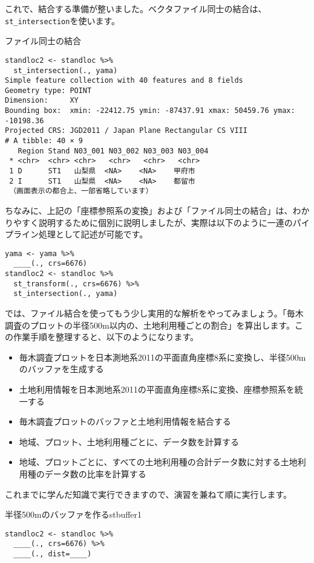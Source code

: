 これで、結合する準備が整いました。ベクタファイル同士の結合は、\verb|st_intersection|を使います。
\begin{itembox}[l]{ファイル同士の結合}
\begin{verbatim}
standloc2 <- standloc %>%
  st_intersection(., yama)
Simple feature collection with 40 features and 8 fields
Geometry type: POINT
Dimension:     XY
Bounding box:  xmin: -22412.75 ymin: -87437.91 xmax: 50459.76 ymax: -10198.36
Projected CRS: JGD2011 / Japan Plane Rectangular CS VIII
# A tibble: 40 × 9
   Region Stand N03_001 N03_002 N03_003 N03_004
 * <chr>  <chr> <chr>   <chr>   <chr>   <chr>
 1 D      ST1   山梨県  <NA>    <NA>    甲府市
 2 I      ST1   山梨県  <NA>    <NA>    都留市
 （画面表示の都合上、一部省略しています）
\end{verbatim}
\end{itembox}

ちなみに、上記の「座標参照系の変換」および「ファイル同士の結合」は、わかりやすく説明するために個別に説明しましたが、実際は以下のように一連のパイプライン処理として記述が可能です。
\begin{verbatim}
yama <- yama %>%
  ____(., crs=6676)
standloc2 <- standloc %>%
  st_transform(., crs=6676) %>%
  st_intersection(., yama)
\end{verbatim}

では、ファイル結合を使ってもう少し実用的な解析をやってみましょう。「毎木調査のプロットの半径500m以内の、土地利用種ごとの割合」を算出します。この作業手順を整理すると、以下のようになります。
\begin{itemize}
  \item 毎木調査プロットを日本測地系2011の平面直角座標8系に変換し、半径500mのバッファを生成する
  \item 土地利用情報を日本測地系2011の平面直角座標8系に変換、座標参照系を統一する
  \item 毎木調査プロットのバッファと土地利用情報を結合する
  \item 地域、プロット、土地利用種ごとに、データ数を計算する
  \item 地域、プロットごとに、すべての土地利用種の合計データ数に対する土地利用種のデータ数の比率を計算する
\end{itemize}
これまでに学んだ知識で実行できますので、演習を兼ねて順に実行します。

\begin{exercise}{半径500mのバッファを作る}{stbuffer1}
\begin{verbatim}
standloc2 <- standloc %>%
  ____(., crs=6676) %>%
  ____(., dist=____)
\end{verbatim}
\end{exercise}

